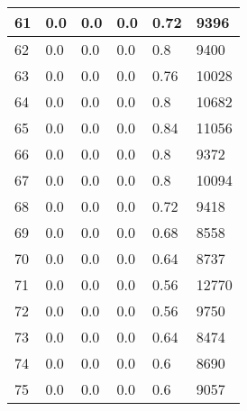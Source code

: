 \begin{longtable}{|l|l|l|l|l|l|}
61 & 0.0 & 0.0 & 0.0 & 0.72 & 9396 \\ \hline 
62 & 0.0 & 0.0 & 0.0 & 0.8 & 9400 \\ \hline 
63 & 0.0 & 0.0 & 0.0 & 0.76 & 10028 \\ \hline 
64 & 0.0 & 0.0 & 0.0 & 0.8 & 10682 \\ \hline 
65 & 0.0 & 0.0 & 0.0 & 0.84 & 11056 \\ \hline 
66 & 0.0 & 0.0 & 0.0 & 0.8 & 9372 \\ \hline 
67 & 0.0 & 0.0 & 0.0 & 0.8 & 10094 \\ \hline 
68 & 0.0 & 0.0 & 0.0 & 0.72 & 9418 \\ \hline 
69 & 0.0 & 0.0 & 0.0 & 0.68 & 8558 \\ \hline 
70 & 0.0 & 0.0 & 0.0 & 0.64 & 8737 \\ \hline 
71 & 0.0 & 0.0 & 0.0 & 0.56 & 12770 \\ \hline 
72 & 0.0 & 0.0 & 0.0 & 0.56 & 9750 \\ \hline 
73 & 0.0 & 0.0 & 0.0 & 0.64 & 8474 \\ \hline 
74 & 0.0 & 0.0 & 0.0 & 0.6 & 8690 \\ \hline 
75 & 0.0 & 0.0 & 0.0 & 0.6 & 9057 \\ \hline 
\end{longtable}